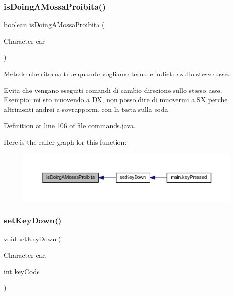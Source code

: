 \subsubsection{\texorpdfstring{is\+Doing\+A\+Mossa\+Proibita()}{isDoingAMossaProibita()}}
{\footnotesize\ttfamily boolean is\+Doing\+A\+Mossa\+Proibita (\begin{DoxyParamCaption}\item[{Character}]{car }\end{DoxyParamCaption})\hspace{0.3cm}{\ttfamily [private]}}



Metodo che ritorna true quando vogliamo tornare indietro sullo stesso asse. 

Evita che vengano eseguiti comandi di cambio direzione sullo stesso asse. Esempio\+: mi sto muovendo a DX, non posso dire di muovermi a SX perche\textquotesingle{} altrimenti andrei a sovrappormi con la testa sulla coda 

Definition at line 106 of file commands.\+java.

Here is the caller graph for this function\+:
\nopagebreak
\begin{figure}[H]
\begin{center}
\leavevmode
\includegraphics[width=350pt]{class_snake_1_1game_1_1utility_1_1commands_a5852b0c61e12c9a0dff32d89faf56a0f_icgraph}
\end{center}
\end{figure}
\mbox{\label{class_snake_1_1game_1_1utility_1_1commands_a116fb077976b2f81b0fc36845423fadb}} 
\subsubsection{\texorpdfstring{set\+Key\+Down()}{setKeyDown()}}
{\footnotesize\ttfamily void set\+Key\+Down (\begin{DoxyParamCaption}\item[{Character}]{car,  }\item[{int}]{key\+Code }\end{DoxyParamCaption})}



